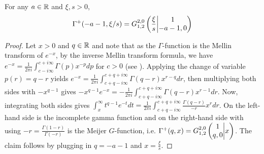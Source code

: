 \begin{appendices}
\begin{lemma}\label{lem:gamma_meijer_G}
For any $a\in \R$ and $\xi, s>0$,
$$\Gamma^+(-a-1,\xi/s) = \MeijerGnew{2}{0}{1}{2}{1}{-a-1,0}{\frac{\xi}{s}}$$
\end{lemma}
\begin{proof}
Let $x>0$ and $q\in\R$ and note that as the $\Gamma$-function is the Mellin transform of $e^{-x}$, by the inverse Mellin transform formula, we have $e^{-x}=\frac{1}{2\pi i}\int_{c-i\infty}^{c+i\infty} \Gamma(p)x^{-p}dp$ for $c>0$ (see \cite[p.196]{davies2012integral}). Applying the change of variable $p(r)=q-r$ yields $e^{-x}=\frac{1}{2\pi i}\int_{c+q-i\infty}^{c+q+i\infty} \Gamma(q-r) x^{r-q}dr$, then multiplying both sides with $-x^{q-1}$ gives $-x^{q-1}e^{-x} = -\frac{1}{2\pi i}\int_{c+q-i\infty}^{c+q+i\infty} \Gamma(q-r) x^{r-1}dr$. Now, integrating both sides gives $\int_x^\infty t^{q-1}e^{-t}dt = \frac{1}{2\pi i}\int_{c+q-i\infty}^{c+q+i\infty}\frac{\Gamma(q-r)}{-r}x^r dr$. On the left-hand side is the incomplete gamma function and on the right-hand side with using $-r= \frac{\Gamma(1-r)}{\Gamma(-r)}$ is the Meijer $G$-function, i.e. $\Gamma^+(q,x)=\MeijerG{2}{0}{1}{2}{1}{q,0}{x}$. The claim follows by plugging in $q=-a-1$ and $x=\frac{\xi}{s}$.
\end{proof}


\end{appendices}
